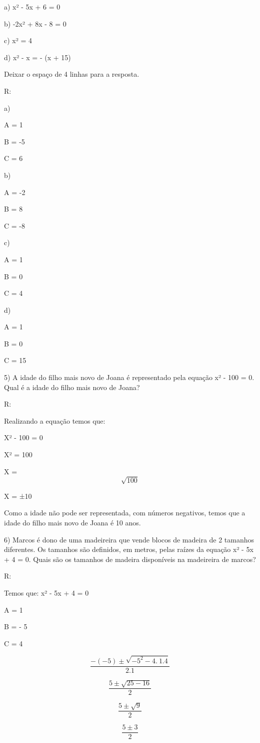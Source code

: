 a) x² - 5x + 6 = 0

b) -2x² + 8x - 8 = 0

c) x² = 4

d) x² - x = - (x + 15)

Deixar o espaço de 4 linhas para a resposta.

R:

a)

A = 1

B = -5

C = 6

b)

A = -2

B = 8

C = -8

c)

A = 1

B = 0

C = 4

d)

A = 1

B = 0

C = 15

5) A idade do filho mais novo de Joana é representado pela equação x² -
100 = 0. Qual é a idade do filho mais novo de Joana?

R:

Realizando a equação temos que:

X² - 100 = 0

X² = 100

X = \[\sqrt{100}\]

X = ±10

Como a idade não pode ser representada, com números negativos, temos que
a idade do filho mais novo de Joana é 10 anos.

6) Marcos é dono de uma madeireira que vende blocos de madeira de 2
tamanhos diferentes. Os tamanhos são definidos, em metros, pelas raízes
da equação x² - 5x + 4 = 0. Quais são os tamanhos de madeira disponíveis
na madeireira de marcos?

R:

Temos que: x² - 5x + 4 = 0

A = 1

B = - 5

C = 4

\[\frac{- ( - 5) \pm \sqrt{{- 5}^{2} - 4.\ 1.4}}{2.1}\]

\[\frac{5 \pm \sqrt{25 - 16}}{2}\]

\[\frac{5 \pm \sqrt{9}}{2}\]

\[\frac{5 \pm 3}{2}\]

